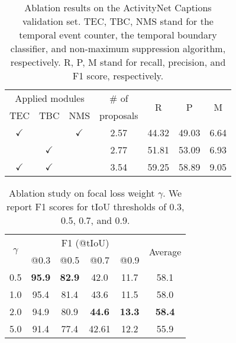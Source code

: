 \begin{table}[t]
  \parbox{\linewidth}{
    \centering
    \caption{
      Ablation results on the ActivityNet Captions validation set.
      TEC, TBC, NMS stand for the temporal event counter, the temporal boundary classifier, and non-maximum suppression algorithm, respectively.
      R, P, M stand for recall, precision, and F1 score, respectively.
    }
    \begin{tabular}{ccc|c|c|c|c}
      \hline
      \multicolumn{3}{c|}{Applied modules} & \# of        & \multirow{2}{*}{R} & \multirow{2}{*}{P} & \multirow{2}{*}{M}                \\
      TEC                                  & TBC          & NMS                & proposals          &                    &              \\
      \hline
      $\checkmark$                         &              & $\checkmark$       & 2.57               & 44.32              & 49.03 & 6.64 \\
                                           & $\checkmark$ &                    & 2.77               & 51.81              & 53.09 & 6.93 \\
      $\checkmark$                         & $\checkmark$ &                    & 3.54               & 59.25              & 58.89 & 9.05 \\
      \hline
    \end{tabular}
    \label{tab:exp_ablation_module}
  }
\end{table}

\begin{table}[t]
  \parbox{\linewidth}{
    \centering
    \caption{
      Ablation study on focal loss weight $\gamma$.
      We report F1 scores for tIoU thresholds of 0.3, 0.5, 0.7, and 0.9.
    }
    \setlength\tabcolsep{6pt}
    \begin{tabular}{c|cccc|c}
      \hline
      \multirow{2}{*}{$\gamma$} & \multicolumn{4}{c|}{F1 (@tIoU)} & \multirow{2}{*}{Average}                                                 \\
                                & @0.3                            & @0.5                     & @0.7          & @0.9          &               \\
      \hline
      0.5                       & \textbf{95.9}                   & \textbf{82.9}            & 42.0          & 11.7          & 58.1          \\
      1.0                       & 95.4                            & 81.4                     & 43.6          & 11.5          & 58.0          \\
      2.0                       & 94.9                            & 80.9                     & \textbf{44.6} & \textbf{13.3} & \textbf{58.4} \\
      5.0                       & 91.4                            & 77.4                     & 42.61         & 12.2          & 55.9          \\
      \hline
    \end{tabular}
    \label{tab:exp_ablation_gamma}
  }
\end{table}

